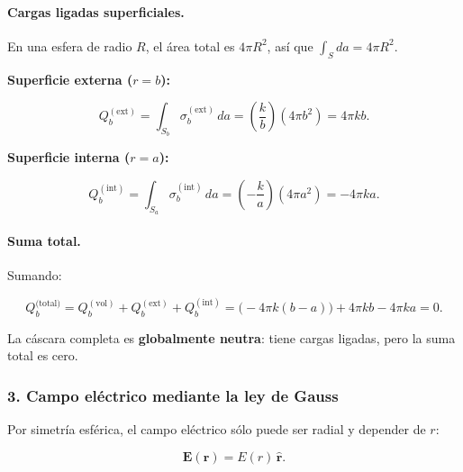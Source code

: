 \documentclass{article}
\begin{document}
\paragraph{Cargas ligadas superficiales.}

En una esfera de radio $R$, el área total es $4\pi R^{2}$, así que
$\int_{S}da = 4\pi R^{2}$.

\medskip

\textbf{Superficie externa ($r=b$):}

\begin{equation}
Q_{b}^{(\text{ext})}
= \int_{S_{b}} \sigma_{b}^{(\text{ext})}\,da
= \left(\frac{k}{b}\right)(4\pi b^{2})
= 4\pi k b.
\label{eq:Qb-ext}
\end{equation}

\textbf{Superficie interna ($r=a$):}

\begin{equation}
Q_{b}^{(\text{int})}
= \int_{S_{a}} \sigma_{b}^{(\text{int})}\,da
= \left(-\frac{k}{a}\right)(4\pi a^{2})
= -4\pi k a.
\label{eq:Qb-int}
\end{equation}

\paragraph{Suma total.}

Sumando:

\begin{equation}
Q_{b}^{\text{(total)}}
= Q_{b}^{(\text{vol})} + Q_{b}^{(\text{ext})} + Q_{b}^{(\text{int})}
= \bigl(-4\pi k(b-a)\bigr) + 4\pi k b - 4\pi k a = 0.
\label{eq:Qb-total-shell}
\end{equation}

La cáscara completa es \textbf{globalmente neutra}: tiene cargas ligadas, pero
la suma total es cero.

\subsubsection*{3. Campo eléctrico mediante la ley de Gauss}

Por simetría esférica, el campo eléctrico sólo puede ser radial y depender de
$r$:

\begin{equation}
\mathbf{E}(\mathbf{r}) = E(r)\,\hat{\mathbf{r}}.
\label{eq:E-r-shell}
\end{equation}
\end{document}
